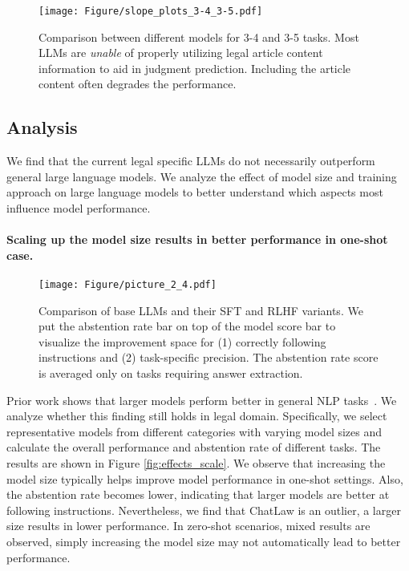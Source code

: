 \begin{figure}[t]
    \centering
    \texttt{[image: Figure/slope\_plots\_3-4\_3-5.pdf]}
    \caption{\small Comparison between different models for 3-4 and 3-5 tasks. Most LLMs are \emph{unable} of properly utilizing legal article content information to aid in judgment prediction. Including the article content often degrades the performance.}
    \label{fig:effects_article}
\end{figure}

\subsection{Analysis}
\label{sec:analysis}

We find that the current legal specific LLMs do not necessarily outperform general large language models. We analyze the effect of model size and training approach on large language models to better understand which aspects most influence model performance. 

\paragraph{Scaling up the model size results in better performance in one-shot case.}

\begin{figure}[t]
    \centering
    \texttt{[image: Figure/picture\_2\_4.pdf]}
    \caption{\small Comparison of base LLMs and their SFT and RLHF variants. We put the abstention rate bar on top of the model score bar to visualize the improvement space for (1) correctly following instructions and (2) task-specific precision. The abstention rate score is averaged only on tasks requiring answer extraction.}
    \label{fig:effects_sft}
\end{figure}

Prior work shows that larger models perform better in general NLP tasks~\cite{kaplan2020scaling}. We analyze whether this finding still holds in legal domain. Specifically, we select representative models from different categories with varying model sizes and calculate the overall performance and abstention rate of different tasks. The results are shown in Figure \ref{fig:effects_scale}. We observe that increasing the model size typically helps improve model performance in one-shot settings. Also, the abstention rate becomes lower, indicating that larger models are better at following instructions. Nevertheless, we find that ChatLaw is an outlier, a larger size results in lower performance. In zero-shot scenarios, mixed results are observed, simply increasing the model size may not automatically lead to better performance.

